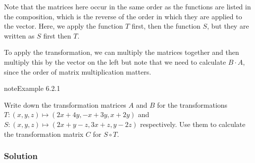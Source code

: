 \documentclass[letterpaper,10pt,english]{jupyterBook}
\begin{document}
\sphinxAtStartPar
Note that the matrices here occur in the same order as the functions are listed in the composition, which is the reverse of the order in which they are applied to the vector. Here, we apply the function \(T\) first, then the function \(S\), but they are written as \(S\) first then \(T\).

\sphinxAtStartPar
To apply the transformation, we can multiply the matrices together and then multiply this by the vector on the left \sphinxhyphen{} but note that we need to calculate \(B \cdot A\), since the order of matrix multiplication matters.
\label{_pages/6.2_Composite_transformations:composite-transformation-matrix-example}
\begin{sphinxadmonition}{note}{Example 6.2.1}



\sphinxAtStartPar
Write down the transformation matrices \(A\) and \(B\) for the transformations \(T:(x, y, z) \mapsto (2 x + 4 y, -x + 3 y, x + 2 y)\) and \(S:(x, y, z) \mapsto (2x + y - z, 3x + z, y - 2z)\) respectively. Use them to calculate the transformation matrix \(C\) for \(S\circ T\).
\subsubsection*{Solution}


\end{sphinxadmonition}
\end{document}
